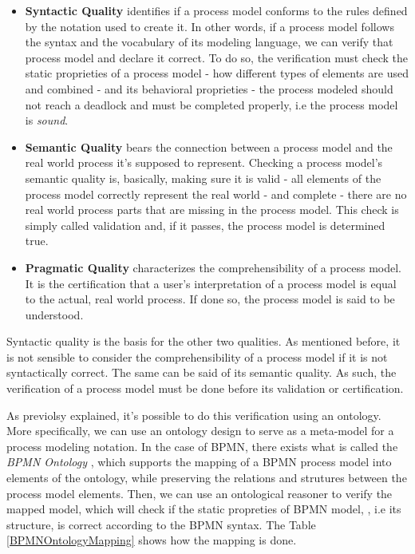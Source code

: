 \documentclass{llncs}
\begin{document}
\begin{itemize}
	\item \textbf{Syntactic Quality} identifies if a process model conforms to the rules defined by the notation used to create it. In other words, if a process model follows the syntax and the vocabulary of its modeling language, we can verify that process model and declare it correct. To do so, the verification must check the static proprieties of a process model - how different types of elements are used and combined - and its behavioral proprieties - the process modeled should not reach a deadlock and must be completed properly, i.e the process model is \textit{sound}.
	\item \textbf{Semantic Quality} bears the connection between a process model and the real world process it's supposed to represent. Checking a process model's semantic quality is, basically, making sure it is valid - all elements of the process model correctly represent the real world - and complete - there are no real world process parts that are missing in the process model. This check is simply called validation and, if it passes, the process model is determined true.
	\item \textbf{Pragmatic Quality} characterizes the comprehensibility of a process model. It is the certification that a user's interpretation of a process model is equal to the actual, real world process. If done so, the process model is said to be understood.
\end{itemize}

Syntactic quality is the basis for the other two qualities. As mentioned before, it is not sensible to consider the comprehensibility of a process model if it is not syntactically correct. The same can be said of its semantic quality. As such, the verification of a process model must be done before its validation or certification.

As previolsy explained, it's possible to do this verification using an ontology. More specifically, we can use an ontology design to serve as a meta-model for a process modeling notation. In the case of BPMN, there exists what is called the \textit{BPMN Ontology} \cite{Rospocher2014foisbpmn}, which supports the mapping of a BPMN process model into elements of the ontology, while preserving the relations and strutures between the process model elements. Then, we can use an ontological reasoner to verify the mapped model, which will check if the static propreties of BPMN model, , i.e its structure, is correct according to the BPMN syntax.
The Table \ref{BPMNOntologyMapping} shows how the mapping is done.
\end{document}
